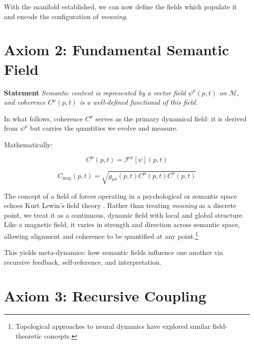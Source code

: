 With the manifold established, we can now define the fields which populate it and encode the configuration of \textit{meaning}.


\section{Axiom 2: Fundamental Semantic Field}
\label{1.2:axiom_2_fundamental_semantic_field}

\textbf{Statement} \textit{Semantic content is represented by a vector field \(\psi^\mu(p,t)\) on \(\mathcal{M}\), and coherence \(C^\mu(p,t)\) is a well-defined functional of this field.}

In what follows, coherence \(C^\mu\) serves as the primary dynamical field: it is derived from \(\psi^\mu\) but carries the quantities we evolve and measure.

Mathematically:

\begin{equation}
C^\mu(p,t) = \mathcal{F}^\mu[\psi](p,t)
\end{equation}

\begin{equation}
C_{\text{mag}}(p,t) = \sqrt{g_{\mu\nu}(p,t) C^\mu(p,t) C^\nu(p,t)}
\end{equation}

The concept of a field of forces operating in a psychological or semantic space echoes Kurt Lewin's field theory \autocite{Lewin1951}. Rather than treating \textit{meaning} as a discrete point, we treat it as a continuous, dynamic field with local and global structure. Like a magnetic field, it varies in strength and direction across semantic space, allowing alignment and coherence to be quantified at any point.\footnote{Topological approaches to neural dynamics \autocite{Bassett2018, Petri2014} have explored similar field-theoretic concepts.}

This yields meta-dynamics: how semantic fields influence one another via recursive feedback, self-reference, and interpretation.


\section{Axiom 3: Recursive Coupling}
\label{1.3:axiom_3_recursive_coupling}

